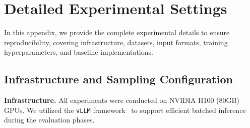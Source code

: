 \documentclass[11pt]{article}
\theoremstyle{plain}
\begin{document}




\section{Detailed Experimental Settings}
\label{app:exp_setup}

In this appendix, we provide the complete experimental details to ensure reproducibility, covering infrastructure, datasets, input formats, training hyperparameters, and baseline implementations.

\subsection{Infrastructure and Sampling Configuration}
\label{app:infrastructure}
\noindent\textbf{Infrastructure.}
All experiments were conducted on NVIDIA H100 (80GB) GPUs.
We utilized the \texttt{vLLM} framework~\cite{kwon2023efficient} to support efficient batched inference during the evaluation phases.
\end{document}
